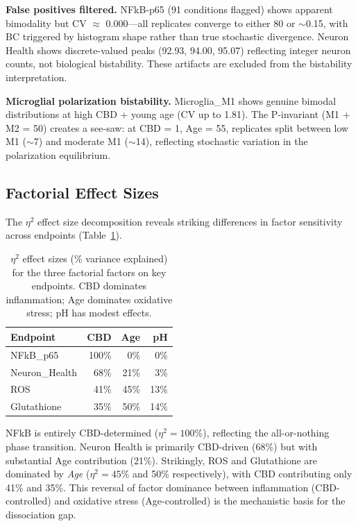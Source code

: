 \documentclass[10pt,letterpaper]{article}
\begin{document}
\vspace{3pt}
\noindent\textbf{False positives filtered.} NFkB-p65 (91 conditions flagged) shows apparent bimodality but CV $\approx$ 0.000---all replicates converge to either 80 or $\sim$0.15, with BC triggered by histogram shape rather than true stochastic divergence. Neuron Health shows discrete-valued peaks (92.93, 94.00, 95.07) reflecting integer neuron counts, not biological bistability. These artifacts are excluded from the bistability interpretation.

\vspace{3pt}
\noindent\textbf{Microglial polarization bistability.} Microglia\_M1 shows genuine bimodal distributions at high CBD + young age (CV up to 1.81). The P-invariant (M1 + M2 = 50) creates a see-saw: at CBD = 1, Age = 55, replicates split between low M1 ($\sim$7) and moderate M1 ($\sim$14), reflecting stochastic variation in the polarization equilibrium.

\subsection{Factorial Effect Sizes}

The $\eta^2$ effect size decomposition reveals striking differences in factor sensitivity across endpoints (Table~\ref{tab:effect_sizes}).

\begin{table}[htbp]
\centering
\caption{$\eta^2$ effect sizes (\% variance explained) for the three factorial factors on key endpoints. CBD dominates inflammation; Age dominates oxidative stress; pH has modest effects.}
\label{tab:effect_sizes}
\begin{tabular}{lrrr}
\toprule
Endpoint & CBD & Age & pH \\
\midrule
NFkB\_p65      & 100\% & 0\%  & 0\%  \\
Neuron\_Health & 68\%  & 21\% & 3\%  \\
ROS            & 41\%  & 45\% & 13\% \\
Glutathione    & 35\%  & 50\% & 14\% \\
\bottomrule
\end{tabular}
\end{table}

NFkB is entirely CBD-determined ($\eta^2=100\%$), reflecting the all-or-nothing phase transition. Neuron Health is primarily CBD-driven (68\%) but with substantial Age contribution (21\%). Strikingly, ROS and Glutathione are dominated by \textit{Age} ($\eta^2=45\%$ and 50\% respectively), with CBD contributing only 41\% and 35\%. This reversal of factor dominance between inflammation (CBD-controlled) and oxidative stress (Age-controlled) is the mechanistic basis for the dissociation gap.
\end{document}
